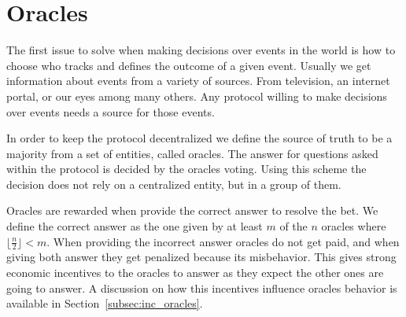 \section{Oracles}

The first issue to solve when making decisions over events in the world is how
  to choose who tracks and defines the outcome of a given event.
Usually we get information about events from a variety of sources.
From television, an internet portal, or our eyes among many others. Any protocol
  willing to make decisions over events needs a source for those events.

In order to keep the protocol decentralized we define the source of truth to be
  a majority from a set of entities, called oracles.
The answer for questions asked within the protocol is decided by the oracles
  voting.
Using this scheme the decision does not rely on a centralized entity, but in a
  group of them.

Oracles are rewarded when provide the correct answer to resolve the bet.
We define the correct answer as the one given by at least $m$ of the $n$ oracles
  where $\lfloor \frac{n}{2} \rfloor < m$.
When providing the incorrect answer oracles do not get paid, and when giving
  both answer they get penalized because its misbehavior. This gives strong
  economic incentives to the oracles to answer as they expect the other ones
  are going to answer.
A discussion on how this incentives influence oracles behavior is available
  in Section~\ref{subsec:inc_oracles}.
